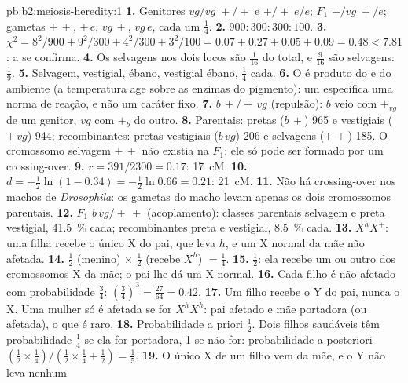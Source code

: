 \begin{solution}{pb:b2:meiosis-heredity:1}
\textbf{1.} Genitores $vg/vg\;+/+$ e $+/+\;e/e$; $F_1$ $+/vg\;+/e$;
gametas $+\,+$, $+\,e$, $vg\,+$, $vg\,e$, cada um $\tfrac14$.
\textbf{2.} $900 : 300 : 300 : 100$.
\textbf{3.} $\chi^2 = 8^2/900 + 9^2/300 + 4^2/300 + 3^2/100 = 0.07 +
0.27 + 0.05 + 0.09 = 0.48 < 7.81$: a  se
confirma.
\textbf{4.} Os  selvagens nos dois locos são $\tfrac{1}{16}$
do total, e $\tfrac{9}{16}$ são selvagens: $\tfrac19$.
\textbf{5.} Selvagem, vestigial, ébano, vestigial ébano, $\tfrac14$
cada.
\textbf{6.} O  é produto do  e do ambiente (a
temperatura age sobre as enzimas do pigmento): um  especifica
uma norma de reação, e não um caráter fixo.
\textbf{7.} $b\,+/+\,vg$ (repulsão): $b$ veio com $+_{vg}$ de um
genitor, $vg$ com $+_b$ do outro.
\textbf{8.} Parentais: pretas ($b\,+$) 965 e vestigiais ($+\,vg$) 944;
recombinantes: pretas vestigiais ($b\,vg$) 206 e selvagens ($+\,+$)
185. O cromossomo selvagem $+\,+$ não existia na $F_1$; ele só pode ser
formado por um crossing-over.
\textbf{9.} $r = 391/2300 = 0.17$: \qty{17}{cM}.
\textbf{10.} $d = -\tfrac12\ln(1 - 0.34) = -\tfrac12\ln 0.66 = 0.21$:
\qty{21}{cM}.
\textbf{11.} Não há crossing-over nos machos de \emph{Drosophila}: os
gametas do macho levam apenas os dois cromossomos parentais.
\textbf{12.} $F_1$ $b\,vg/+\,+$ (acoplamento): classes parentais
selvagem e preta vestigial, \qty{41.5}{\%} cada; recombinantes preta
e vestigial, \qty{8.5}{\%} cada.
\textbf{13.} $X^hX^+$: uma filha recebe o único X do pai, que leva $h$,
e um X normal da mãe não afetada.
\textbf{14.} $\tfrac12$ (menino) $\times$ $\tfrac12$ (recebe $X^h$) $=
\tfrac14$.
\textbf{15.} $\tfrac12$: ela recebe um ou outro dos cromossomos X da
mãe; o pai lhe dá um X normal.
\textbf{16.} Cada filho é não afetado com probabilidade $\tfrac34$:
$(\tfrac34)^3 = \tfrac{27}{64} = 0.42$.
\textbf{17.} Um filho recebe o Y do pai, nunca o X. Uma mulher só é
afetada se for $X^hX^h$: pai afetado e mãe portadora (ou afetada), o
que é raro.
\textbf{18.} Probabilidade a priori $\tfrac12$. Dois filhos saudáveis
têm probabilidade $\tfrac14$ se ela for portadora, 1 se não for:
probabilidade a posteriori $(\tfrac12\times
\tfrac14)/(\tfrac12\times\tfrac14 + \tfrac12) = \tfrac15$.
\textbf{19.} O único X de um filho vem da mãe, e o Y não leva nenhum

\end{solution}

